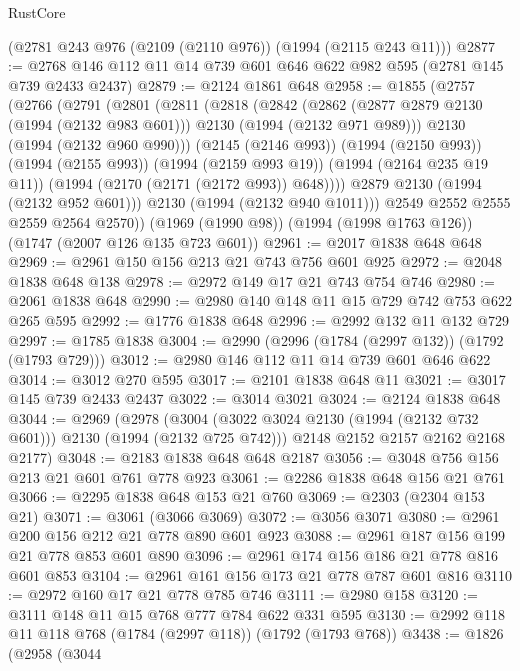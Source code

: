 \begin{lexlean}{RustCore}
\begin{coremodule}
    (@2781 @243 @976 (@2109 (@2110 @976)) (@1994 (@2115 @243 @11)))
@2877 := @2768 @146 @112 @11 @14 @739 @601 @646 @622 @982 @595 (@2781 @145 @739 @2433 @2437)
@2879 := @2124 @1861 @648
@2958 := @1855
    (@2757
      (@2766
        (@2791
          (@2801
            (@2811
              (@2818
                (@2842
                  (@2862
                    (@2877 @2879 @2130 (@1994 (@2132 @983 @601)))
                    @2130
                    (@1994 (@2132 @971 @989)))
                  @2130
                  (@1994 (@2132 @960 @990)))
                (@2145 (@2146 @993))
                (@1994 (@2150 @993))
                (@1994 (@2155 @993))
                (@1994 (@2159 @993 @19))
                (@1994 (@2164 @235 @19 @11))
                (@1994 (@2170 (@2171 (@2172 @993)) @648))))
            @2879
            @2130
            (@1994 (@2132 @952 @601)))
          @2130
          (@1994 (@2132 @940 @1011)))
        @2549
        @2552
        @2555
        @2559
        @2564
        @2570))
    (@1969 (@1990 @98))
    (@1994 (@1998 @1763 @126))
    (@1747 (@2007 @126 @135 @723 @601))
@2961 := @2017 @1838 @648 @648
@2969 := @2961 @150 @156 @213 @21 @743 @756 @601 @925
@2972 := @2048 @1838 @648 @138
@2978 := @2972 @149 @17 @21 @743 @754 @746
@2980 := @2061 @1838 @648
@2990 := @2980 @140 @148 @11 @15 @729 @742 @753 @622 @265 @595
@2992 := @1776 @1838 @648
@2996 := @2992 @132 @11 @132 @729
@2997 := @1785 @1838
@3004 := @2990 (@2996 (@1784 (@2997 @132)) (@1792 (@1793 @729)))
@3012 := @2980 @146 @112 @11 @14 @739 @601 @646 @622
@3014 := @3012 @270 @595
@3017 := @2101 @1838 @648 @11
@3021 := @3017 @145 @739 @2433 @2437
@3022 := @3014 @3021
@3024 := @2124 @1838 @648
@3044 := @2969
    (@2978
      (@3004 (@3022 @3024 @2130 (@1994 (@2132 @732 @601))) @2130 (@1994 (@2132 @725 @742)))
      @2148
      @2152
      @2157
      @2162
      @2168
      @2177)
@3048 := @2183 @1838 @648 @648 @2187
@3056 := @3048 @756 @156 @213 @21 @601 @761 @778 @923
@3061 := @2286 @1838 @648 @156 @21 @761
@3066 := @2295 @1838 @648 @153 @21 @760
@3069 := @2303 (@2304 @153 @21)
@3071 := @3061 (@3066 @3069)
@3072 := @3056 @3071
@3080 := @2961 @200 @156 @212 @21 @778 @890 @601 @923
@3088 := @2961 @187 @156 @199 @21 @778 @853 @601 @890
@3096 := @2961 @174 @156 @186 @21 @778 @816 @601 @853
@3104 := @2961 @161 @156 @173 @21 @778 @787 @601 @816
@3110 := @2972 @160 @17 @21 @778 @785 @746
@3111 := @2980 @158
@3120 := @3111 @148 @11 @15 @768 @777 @784 @622 @331 @595
@3130 := @2992 @118 @11 @118 @768 (@1784 (@2997 @118)) (@1792 (@1793 @768))
@3438 := @1826
    (@2958
      (@3044

\end{coremodule}
\end{lexlean}
